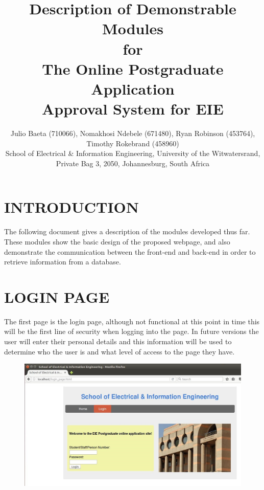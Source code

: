 \documentclass[journal,comsoc,onecolumn]{IEEEtran}
\begin{document}

\title{Description of Demonstrable Modules \\ \vspace{7mm} for \\ \vspace{7mm} The Online Postgraduate Application \\ Approval System for EIE}

\author{\vspace{3mm} Julio Baeta (710066), Nomakhosi Ndebele (671480), Ryan Robinson (453764), Timothy Rokebrand (458960)\\ \small \vspace{2mm} School of Electrical \& Information Engineering, University of the Witwatersrand, Private Bag 3, 2050, Johannesburg, South Africa}

\markboth{}{}

\maketitle

\thispagestyle{empty}


\newpage

\thispagestyle{empty}

\section{INTRODUCTION}
The following document gives a description of the modules developed thus far. These modules show the basic design of the proposed webpage, and also demonstrate the communication between the front-end and back-end in order to retrieve information from a database.

\section{LOGIN PAGE}
The first page is the login page, although not functional at this point in time this will be the first line of security when logging into the page.  In future versions the user will enter their personal details and this information will be used to determine who the user is and what level of access to  the page they have.

\begin{figure}[h]
\centering
\includegraphics[width=0.7\linewidth]{loginpage}
\caption{}
\label{fig:loginpage}
\end{figure}
\end{document}
